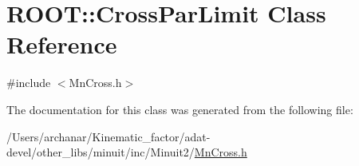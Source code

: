 \hypertarget{classROOT_1_1Minuit2_1_1MnCross_1_1CrossParLimit}{}\section{R\+O\+OT\+:\+:Cross\+Par\+Limit Class Reference}
\label{classROOT_1_1Minuit2_1_1MnCross_1_1CrossParLimit}


{\ttfamily \#include $<$Mn\+Cross.\+h$>$}



The documentation for this class was generated from the following file\+:\begin{DoxyCompactItemize}
\item 
/\+Users/archanar/\+Kinematic\+\_\+factor/adat-\/devel/other\+\_\+libs/minuit/inc/\+Minuit2/\mbox{\hyperlink{adat-devel_2other__libs_2minuit_2inc_2Minuit2_2MnCross_8h}{Mn\+Cross.\+h}}\end{DoxyCompactItemize}
